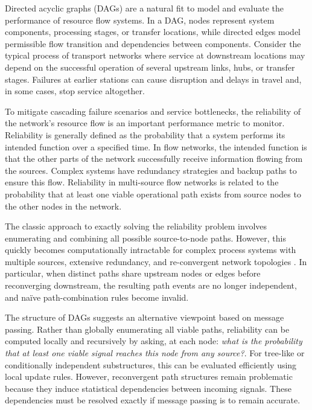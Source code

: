 \documentclass[preprint,12pt]{elsarticle}
\begin{document}
Directed acyclic graphs (DAGs) are a natural fit to model and evaluate the performance of resource flow systems. In a DAG, nodes represent system components, processing stages, or transfer locations, while directed edges model permissible flow transition and dependencies between components. Consider the typical process of transport networks where service at downstream locations may depend on the successful operation of several upstream links, hubs, or transfer stages. Failures at earlier stations can cause disruption and delays in travel and, in some cases, stop service altogether.

To mitigate cascading failure scenarios and service bottlenecks, the reliability of the network's resource flow is an important performance metric to monitor. Reliability is generally defined as the probability that a system performs its intended function over a specified time. In flow networks, the intended function is that the other parts of the network successfully receive information flowing from the sources. Complex systems have redundancy strategies and backup paths to ensure this flow. Reliability in multi-source flow networks is related to the probability that at least one viable operational path exists from source nodes to the other nodes in the network.

The classic approach to exactly solving the reliability problem involves enumerating and combining all possible source-to-node paths. However, this quickly becomes computationally intractable for complex process systems with multiple sources, extensive redundancy, and re-convergent network topologies  \cite{george-williams_simulation_2021}. In particular, when distinct paths share upstream nodes or edges before reconverging downstream, the resulting path events are no longer independent, and naïve path-combination rules become invalid.

The structure of DAGs suggests an alternative viewpoint based on message passing. Rather than globally enumerating all viable paths, reliability can be computed locally and recursively by asking, at each node: \emph{what is the probability that at least one viable signal reaches this node from any source?}. For tree-like or conditionally independent substructures, this can be evaluated efficiently using local update rules. However, reconvergent path structures remain problematic because they induce statistical dependencies between incoming signals. These dependencies must be resolved exactly if message passing is to remain accurate.
\end{document}
